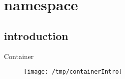 \section{namespace}
\subsection{introduction}
\begin{frame}{Container}{~}
    \begin{figure}
        \center
            \texttt{[image: /tmp/containerIntro]}
        
    \end{figure}

\end{frame}